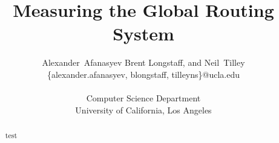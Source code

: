 \documentclass[conference]{IEEEtran}%
\title{Measuring the Global Routing System}
\author{Alexander~Afanasyev %
Brent Longstaff, and Neil~Tilley \\ %
\small \{alexander.afanasyev, blongstaff, tilleyns\}@ucla.edu \\ \\
\small Computer Science Department \\
\small University of California, Los Angeles 
}
\begin{document}
\maketitle

\begin{abstract}
	test
\end{abstract}












% 
% 

% 
% 




\end{document}
